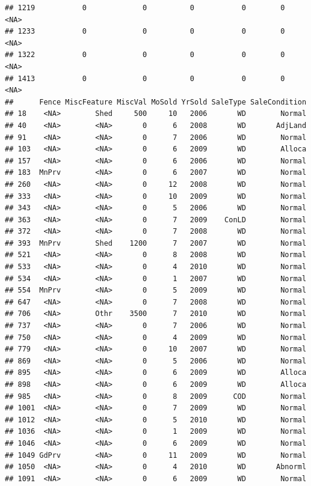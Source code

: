 \documentclass[]{article}
\begin{document}
\begin{verbatim}
## 1219           0             0          0           0        0   <NA>
## 1233           0             0          0           0        0   <NA>
## 1322           0             0          0           0        0   <NA>
## 1413           0             0          0           0        0   <NA>
##      Fence MiscFeature MiscVal MoSold YrSold SaleType SaleCondition
## 18    <NA>        Shed     500     10   2006       WD        Normal
## 40    <NA>        <NA>       0      6   2008       WD       AdjLand
## 91    <NA>        <NA>       0      7   2006       WD        Normal
## 103   <NA>        <NA>       0      6   2009       WD        Alloca
## 157   <NA>        <NA>       0      6   2006       WD        Normal
## 183  MnPrv        <NA>       0      6   2007       WD        Normal
## 260   <NA>        <NA>       0     12   2008       WD        Normal
## 333   <NA>        <NA>       0     10   2009       WD        Normal
## 343   <NA>        <NA>       0      5   2006       WD        Normal
## 363   <NA>        <NA>       0      7   2009    ConLD        Normal
## 372   <NA>        <NA>       0      7   2008       WD        Normal
## 393  MnPrv        Shed    1200      7   2007       WD        Normal
## 521   <NA>        <NA>       0      8   2008       WD        Normal
## 533   <NA>        <NA>       0      4   2010       WD        Normal
## 534   <NA>        <NA>       0      1   2007       WD        Normal
## 554  MnPrv        <NA>       0      5   2009       WD        Normal
## 647   <NA>        <NA>       0      7   2008       WD        Normal
## 706   <NA>        Othr    3500      7   2010       WD        Normal
## 737   <NA>        <NA>       0      7   2006       WD        Normal
## 750   <NA>        <NA>       0      4   2009       WD        Normal
## 779   <NA>        <NA>       0     10   2007       WD        Normal
## 869   <NA>        <NA>       0      5   2006       WD        Normal
## 895   <NA>        <NA>       0      6   2009       WD        Alloca
## 898   <NA>        <NA>       0      6   2009       WD        Alloca
## 985   <NA>        <NA>       0      8   2009      COD        Normal
## 1001  <NA>        <NA>       0      7   2009       WD        Normal
## 1012  <NA>        <NA>       0      5   2010       WD        Normal
## 1036  <NA>        <NA>       0      1   2009       WD        Normal
## 1046  <NA>        <NA>       0      6   2009       WD        Normal
## 1049 GdPrv        <NA>       0     11   2009       WD        Normal
## 1050  <NA>        <NA>       0      4   2010       WD       Abnorml
## 1091  <NA>        <NA>       0      6   2009       WD        Normal

\end{verbatim}
\end{document}
